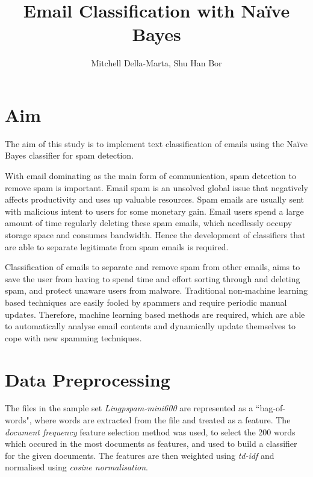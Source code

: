 \documentclass[10pt, a4paper]{article}
\title{Email Classification with Na\"ive Bayes}
\author{Mitchell Della-Marta, Shu Han Bor}
\begin{document}
\maketitle

\section{Aim}

The aim of this study is to implement text classification of emails using the Na\"ive Bayes classifier for spam detection.

With email dominating as the main form of communication, spam detection to remove spam is important. Email spam is an unsolved global issue that negatively affects productivity and uses up valuable resources. Spam emails are usually sent with malicious intent to users for some monetary gain. Email users spend a large amount of time regularly deleting these spam emails, which needlessly occupy storage space and consumes bandwidth. Hence the development of classifiers that are able to separate legitimate from spam emails is required.

Classification of emails to separate and remove spam from other emails, aims to save the user from having to spend time and effort sorting through and deleting spam, and protect unaware users from malware. Traditional non-machine learning based techniques are easily fooled by spammers and require periodic manual updates. Therefore, machine learning based methods are required, which are able to automatically analyse email contents and dynamically update themselves to cope with new spamming techniques.

\section{Data Preprocessing}

The files in the sample set \emph{Lingpspam-mini600} are represented as a ``bag-of-words", where words are extracted from the file and treated as a feature. The \emph{document frequency} feature selection method was used, to select the 200 words which occured in the most documents as features, and used to build a classifier for the given documents. The features are then weighted using \emph{td-idf} and normalised using \emph{cosine normalisation}\cite{sebastiani}.
\end{document}
